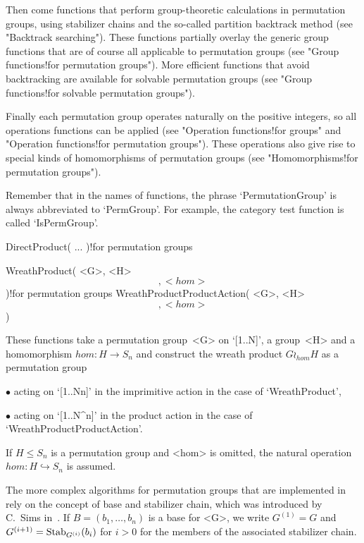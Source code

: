 Then  come functions that     perform  group-theoretic calculations    in
permutation groups, using  stabilizer chains and  the so-called partition
backtrack  method (see "Backtrack  searching"). These functions partially
overlay the generic group functions that  are of course all applicable to
permutation groups (see "Group  functions!for permutation  groups"). More
efficient functions that   avoid backtracking are available for  solvable
permutation groups (see   "Group   functions!for   solvable   permutation
groups").

Finally  each permutation    group  operates naturally    on the positive
integers,  so all  operations  functions can  be applied (see  "Operation
functions!for  groups" and "Operation functions!for permutation groups").
These operations  also give  rise to  special kinds  of  homomorphisms of
permutation groups (see "Homomorphisms!for permutation groups").

Remember that     in   the  names   of  {\GAP}    functions,  the  phrase
`PermutationGroup' is always abbreviated to `PermGroup'. For example, the
category test function is called `IsPermGroup'.


\>DirectProduct( ... )!{for permutation groups}

\>WreathProduct( <G>, <H> \[, <hom> \] )!{for permutation groups}
\>WreathProductProductAction( <G>, <H> \[, <hom> \] )

These functions take a permutation group~<G> on `[1..N]', a group~<H> and
a homomorphism  $hom\colon  H\to S_n$ and  construct  the wreath  product
$G\wr_{hom}H$ as a permutation group
{\parindent\manindent
\item{$\bullet$} acting  on `[1..N\*n]' in the  imprimitive action in the
case of `WreathProduct',
\item{$\bullet$} acting on  `[1..N^n]' in the product  action in the case
of `WreathProductProductAction'.\par}
If $H\le S_n$  is a permutation group  and <hom> is  omitted, the natural
operation $hom\colon H\hookrightarrow S_n$ is assumed.


The more complex algorithms  for permutation groups that  are implemented
in  {\GAP} rely on the concept  of base and  stabilizer  chain, which was
introduced by C.~Sims in~\cite{Sims70}. If   $B=(b_1, \ldots, b_n)$ is  a
base    for   <G>,   we    write    $G^{(1)}=G$   and     $G^{(i+1)}={\rm
Stab}_{G^{(i)}}(b_i)$   for $i>0$  for the   members   of the  associated
stabilizer chain.

